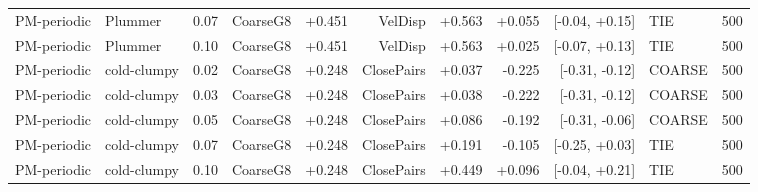 \begin{tabular}{lllrrrrrrlr}
PM-periodic & Plummer & 0.07 & CoarseG8 & +0.451 & VelDisp & +0.563 & +0.055 & [-0.04, +0.15] & TIE & 500\\
PM-periodic & Plummer & 0.10 & CoarseG8 & +0.451 & VelDisp & +0.563 & +0.025 & [-0.07, +0.13] & TIE & 500\\
PM-periodic & cold-clumpy & 0.02 & CoarseG8 & +0.248 & ClosePairs & +0.037 & -0.225 & [-0.31, -0.12] & COARSE & 500\\
PM-periodic & cold-clumpy & 0.03 & CoarseG8 & +0.248 & ClosePairs & +0.038 & -0.222 & [-0.31, -0.12] & COARSE & 500\\
PM-periodic & cold-clumpy & 0.05 & CoarseG8 & +0.248 & ClosePairs & +0.086 & -0.192 & [-0.31, -0.06] & COARSE & 500\\
PM-periodic & cold-clumpy & 0.07 & CoarseG8 & +0.248 & ClosePairs & +0.191 & -0.105 & [-0.25, +0.03] & TIE & 500\\
PM-periodic & cold-clumpy & 0.10 & CoarseG8 & +0.248 & ClosePairs & +0.449 & +0.096 & [-0.04, +0.21] & TIE & 500\\
\bottomrule
\end{tabular}

